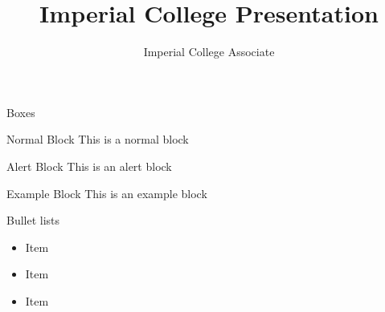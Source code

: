\documentclass{beamer}
\author{Imperial College Associate}
\title{Imperial College Presentation}
\institute{Imperial College Department}
\begin{document}
{
\begin{frame}
\titlepage
\end{frame}
}

\begin{frame}{Boxes}
\begin{block}{Normal Block}
This is a normal block
\end{block}
\begin{alertblock}{Alert Block}
This is an alert block
\end{alertblock}
\begin{exampleblock}{Example Block}
This is an example block
\end{exampleblock}
\end{frame}

\begin{frame}{Bullet lists}
  \begin{itemize}
    \item Item
    \item Item
    \item Item
  \end{itemize}
\end{frame}
\end{document}
